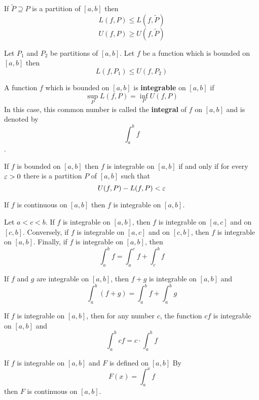 \begin{theorem*}
  If $\tilde{P} \supseteq P$ is a partition of $[a, b]$ then \[L(f, P) \le L(f, \tilde{P})\] \[U(f, P) \ge U(f, \tilde{P})\]
\end{theorem*}

\begin{theorem*}
  Let $P_1$ and $P_2$ be partitions of $[a, b]$.
  Let $f$ be a function which is bounded on $[a, b]$ then 
  \[L(f, P_1) \le U(f, P_2)\]
\end{theorem*}

\begin{definition*}
  A function $f$ which is bounded on $[a, b]$ is \textbf{integrable} on $[a, b]$ if 
  \[\sup_P L(f, P) = \inf_P U(f, P)\]
  In this case, this common number is called the \textbf{integral} of $f$ on $[a, b]$ and is denoted by \[\int_a^b f\].
\end{definition*}

\begin{theorem*}
  If $f$ is bounded on $[a, b]$ then $f$ is integrable on $[a, b]$ if and only if for every $\varepsilon > 0$ there is a partition $P$ of $[a, b]$ such that
  \[ U(f, P) - L(f, P) < \varepsilon \]
\end{theorem*}

\begin{theorem*}
  If $f$ is continuous on $[a, b]$ then $f$ is integrable on $[a, b]$.
\end{theorem*}

\begin{theorem*}
  Let $a < c < b$. If $f$ is integrable on $[a, b]$, then $f$ is integrable on $[a, c]$ and on $[c, b]$.
  Conversely, if $f$ is integrable on $[a, c]$ and on $[c, b]$, then $f$ is integrable on $[a, b]$.
  Finally, if $f$ is integrable on $[a, b]$, then
  \[\int_a^b f = \int_a^c f + \int_c^b f\]
\end{theorem*}

\begin{theorem*}
  If $f$ and $g$ are integrable on $[a, b]$, then $f + g$ is integrable on $[a, b]$ and 
  \[ \int_a^b (f + g) = \int_a^b f + \int_a^b g \]
\end{theorem*}

\begin{theorem*}
  If $f$ is integrable on $[a, b]$, then for any number $c$, the function $cf$ is integrable on $[a, b]$ and 
  \[ \int_a^b cf = c \cdot\int_a^b f \]
\end{theorem*}

\begin{theorem*}
  If $f$ is integrable on $[a, b]$ and $F$ is defined on $[a, b]$ By
  \[F(x) = \int_a^x f\]
  then $F$ is continuous on $[a, b]$.
\end{theorem*}
